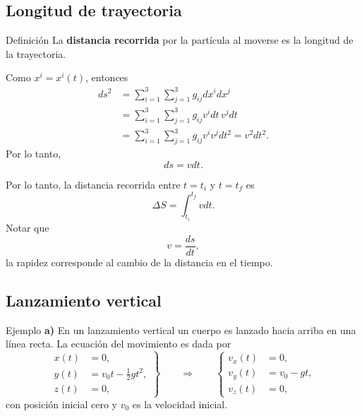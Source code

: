\documentclass[../apunte_mecanica_clasica.tex]{subfiles}%
\begin{document}
\subsection{Longitud de trayectoria}

\begin{apuntebloque}{Definición}
La \textbf{distancia recorrida} por la partícula al moverse es la longitud de la trayectoria.
\end{apuntebloque}

Como $x^i=x^i(t)$, entonces
\begin{align}
    ds^2
    &=\sum_{i=1}^{3}\sum_{j=1}^{3}g_{ij}dx^i dx^j \\
    &=\sum_{i=1}^{3}\sum_{j=1}^{3}g_{ij}v^i dt\,v^j dt \\
    &=\sum_{i=1}^{3}\sum_{j=1}^{3}g_{ij}v^i v^j dt^2
      =v^2dt^2.
\end{align}
Por lo tanto,
\begin{equation}
    ds=vdt.
    \label{eq:mecanica-ds-vdt}
\end{equation}

Por lo tanto, la distancia recorrida entre $t=t_i$ y $t=t_f$ es
\begin{equation}
    \Delta S=\int_{t_i}^{t_f}vdt.
    \label{eq:mecanica-distancia-integral}
\end{equation}
Notar que
\begin{equation}
    v=\frac{ds}{dt},
    \label{eq:mecanica-rapidez-dsdt}
\end{equation}
la rapidez corresponde al cambio de la distancia en el tiempo.

\subsection{Lanzamiento vertical}

\begin{apuntebloque}{Ejemplo}
\textbf{a)} En un lanzamiento vertical un cuerpo es lanzado hacia arriba en una línea recta. La ecuación del movimiento es dada por
\begin{equation*}
\left.
\begin{aligned}
    x(t)&=0,\\
    y(t)&=v_0t-\frac{1}{2}gt^2,\\
    z(t)&=0,
\end{aligned}
\right\}
\qquad\Longrightarrow\qquad
\left\{
\begin{aligned}
    v_x(t)&=0,\\
    v_y(t)&=v_0-gt,\\
    v_z(t)&=0,
\end{aligned}
\right.
\end{equation*}
con posición inicial cero y $v_0$ es la velocidad inicial.
\end{apuntebloque}
\end{document}
